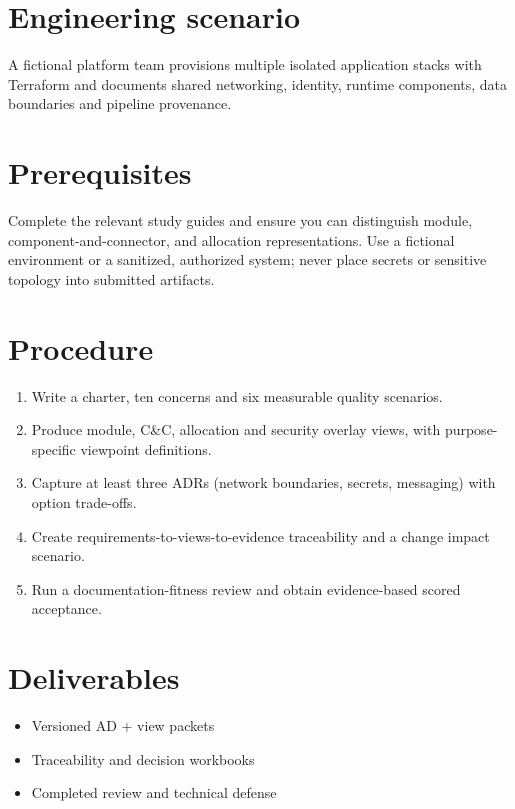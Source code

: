 \documentclass[10pt,letterpaper]{article}
\begin{document}
\DocProvenance
\section{Engineering scenario}
A fictional platform team provisions multiple isolated application stacks with Terraform and documents shared networking, identity, runtime components, data boundaries and pipeline provenance.

\section{Prerequisites}
Complete the relevant study guides and ensure you can distinguish module, component-and-connector, and allocation representations. Use a fictional environment or a sanitized, authorized system; never place secrets or sensitive topology into submitted artifacts.

\section{Procedure}
\begin{enumerate}
\item Write a charter, ten concerns and six measurable quality scenarios.
\item Produce module, C\&C, allocation and security overlay views, with purpose-specific viewpoint definitions.
\item Capture at least three ADRs (network boundaries, secrets, messaging) with option trade-offs.
\item Create requirements-to-views-to-evidence traceability and a change impact scenario.
\item Run a documentation-fitness review and obtain evidence-based scored acceptance.
\end{enumerate}
\section{Deliverables}
\begin{itemize}
\item Versioned AD + view packets
\item Traceability and decision workbooks
\item Completed review and technical defense
\end{itemize}
\end{document}
